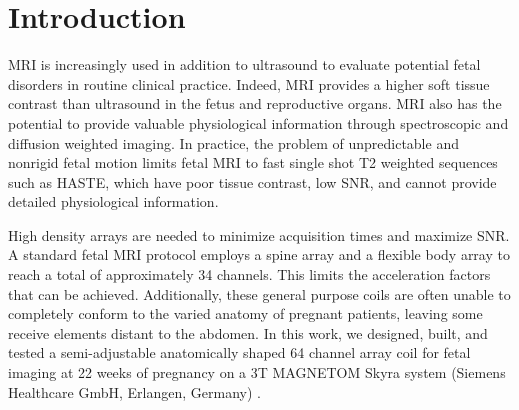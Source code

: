 \chapter{Introduction}
MRI is increasingly used in addition to ultrasound to evaluate potential fetal disorders in routine clinical practice.
Indeed, MRI provides a higher soft tissue contrast than ultrasound in the fetus and reproductive organs. MRI also has
the potential to provide valuable physiological information through spectroscopic and diffusion weighted imaging. In
practice, the problem of unpredictable and nonrigid fetal motion limits fetal MRI to fast single shot T2 weighted
sequences such as HASTE, which have poor tissue contrast, low SNR, and cannot provide detailed physiological information.

High density arrays are needed to minimize acquisition times and maximize SNR. A standard fetal MRI protocol employs a
spine array and a flexible body array to reach a total of approximately 34 channels. This limits the acceleration
factors that can be achieved. Additionally, these general purpose coils are often unable to completely conform to the
varied anatomy of pregnant patients, leaving some receive elements distant to the abdomen. In this work, we designed,
built, and tested a semi-adjustable anatomically shaped 64 channel array coil for fetal imaging at 22 weeks of pregnancy
on a 3T MAGNETOM Skyra system (Siemens Healthcare GmbH, Erlangen, Germany) .
